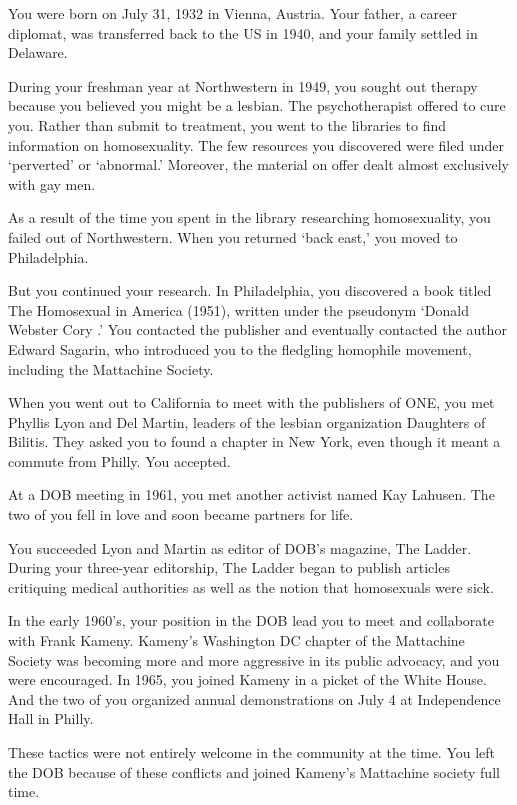 \begin{refsection}
You were born on July 31, 1932 in Vienna, Austria. Your father, a career diplomat, was transferred back to the US in 1940, and your family settled in Delaware.

During your freshman year at Northwestern in 1949, you sought out therapy because you believed you might be a lesbian. The psychotherapist offered to cure you. Rather than submit to treatment, you went to the libraries to find information on homosexuality. The few resources you discovered were filed under `perverted' or `abnormal.' Moreover, the material on offer dealt almost exclusively with gay men.

As a result of the time you spent in the library researching homosexuality, you failed out of Northwestern. When you returned `back east,' you moved to Philadelphia.

But you continued your research. In Philadelphia, you discovered a book titled The Homosexual in America (1951), written under the pseudonym `Donald Webster Cory .' You contacted the publisher and eventually contacted the author Edward Sagarin, who introduced you to the fledgling homophile movement, including the Mattachine Society.

When you went out to California to meet with the publishers of ONE, you met Phyllis Lyon and Del Martin, leaders of the lesbian organization Daughters of Bilitis. They asked you to found a chapter in New York, even though it meant a commute from Philly. You accepted. 

At a DOB meeting in 1961, you met another activist named Kay Lahusen. The two of you fell in love and soon became partners for life.

You succeeded Lyon and Martin as editor of DOB's magazine, The Ladder. During your three-year editorship, The Ladder began to publish articles critiquing medical authorities as well as the notion that homosexuals were sick.

In the early 1960's, your position in the DOB lead you to meet and collaborate with Frank Kameny. Kameny's Washington DC chapter of the Mattachine Society was becoming more and more aggressive in its public advocacy, and you were encouraged. In 1965, you joined Kameny in a picket of the White House. And the two of you organized annual demonstrations on July 4 at Independence Hall in Philly.

These tactics were not entirely welcome in the community at the time. You left the DOB because of these conflicts and joined Kameny's Mattachine society full time.


\end{refsection}
